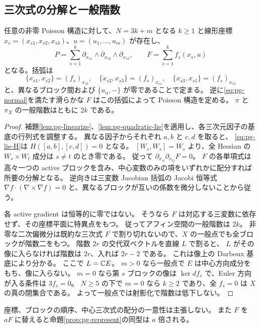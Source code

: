 \subsection{三次式の分解と一般階数}
\begin{theorem}\label{thm:pg-normal}\label{pthm:normal-form}
任意の非零 Poisson 構造に対して、$N=3k+m$ となる $k\geq1$ と線形座標
$x_s=(x_{s1},x_{s2},x_{s3})$、$u=(u_1,\ldots,u_m)$ が存在し、
\begin{equation}
P=\sum_{s=1}^k\partial_{x_{s1}}\wedge\partial_{x_{s2}}\wedge\partial_{x_{s3}},
\qquad F=\sum_{s=1}^k f_s(x_s,u)\label{eq:pg-normal}
\end{equation}
となる。括弧は
\begin{equation}
\{x_{s1},x_{s2}\}=(f_s)_{x_{s3}},\quad
\{x_{s2},x_{s3}\}=(f_s)_{x_{s1}},\quad
\{x_{s3},x_{s1}\}=(f_s)_{x_{s2}}\label{eq:pg-bracket}
\end{equation}
と、異なるブロック間および $\{u_\alpha,-\}$ が零であることで定まる。
逆に\eqref{eq:pg-normal}を満たす滑らかな $F$ はこの括弧によって Poisson 構造を定める。
$\pi$ と $\pi_X$ の一般階数はともに $2k$ である。
\end{theorem}
\begin{proof}
補題\ref{lem:pg-linearize}、\ref{lem:pg-quadratic-lie}を適用し、各三次元因子の基底の行列式を調整する。
異なる因子からそれぞれ $a,b$ と $c,d$ を取ると、
\eqref{eq:pg-lie-H}は $H([a,b],[c,d])=0$ となる。
$[W_s,W_s]=W_s$ より、全 Hessian の $W_s\times W_t$ 成分は $s\neq t$ のとき零である。
従って $\partial_{x_{si}}\partial_{x_{tj}}F=0$。
$F$ の各単項式は高々一つの active ブロックを含み、中心変数のみの項をいずれかに配分すれば所要の分解となる。
逆向きは三変数 Jacobian 括弧の Jacobi 恒等式
$\nabla f\cdot(\nabla\times\nabla f)=0$ と、異なるブロックが互いの係数を微分しないことから従う。

各 active gradient は恒等的に零ではない。
そうなら $F$ は対応する三変数に依存せず、その座標平面に特異点をもつ。
従ってアフィン空間の一般階数は $2k$。
非零な二次偏微分は既約な三次式 $F$ で割り切れないので、$X$ の一般点でも全ブロックが階数二をもつ。
階数 $2r$ の交代双ベクトルを直線 $L$ で割ると、
$L$ がその像に入らなければ階数は $2r$、入れば $2r-2$ である。
これは像上の Darboux 基底により分かる。
ここで $L=\mathbb C E$。
$m>0$ なら一般点で $E$ は中心方向成分をもち、像に入らない。
$m=0$ なら第 $s$ ブロックの像は $\ker df_s$ で、Euler 方向が入る条件は $3f_s=0$。
$N\geq5$ の下で $m=0$ なら $k\geq2$ であり、全 $f_s=0$ は $X$ の真の閉集合である。
よって一般点では射影化で階数は低下しない。
\end{proof}
座標、ブロックの順序、中心三次式の配分の一意性は主張しない。
また $F$ を $aF$ に替えると命題\ref{prop:pg-represent}の同型は $a$ 倍される。

